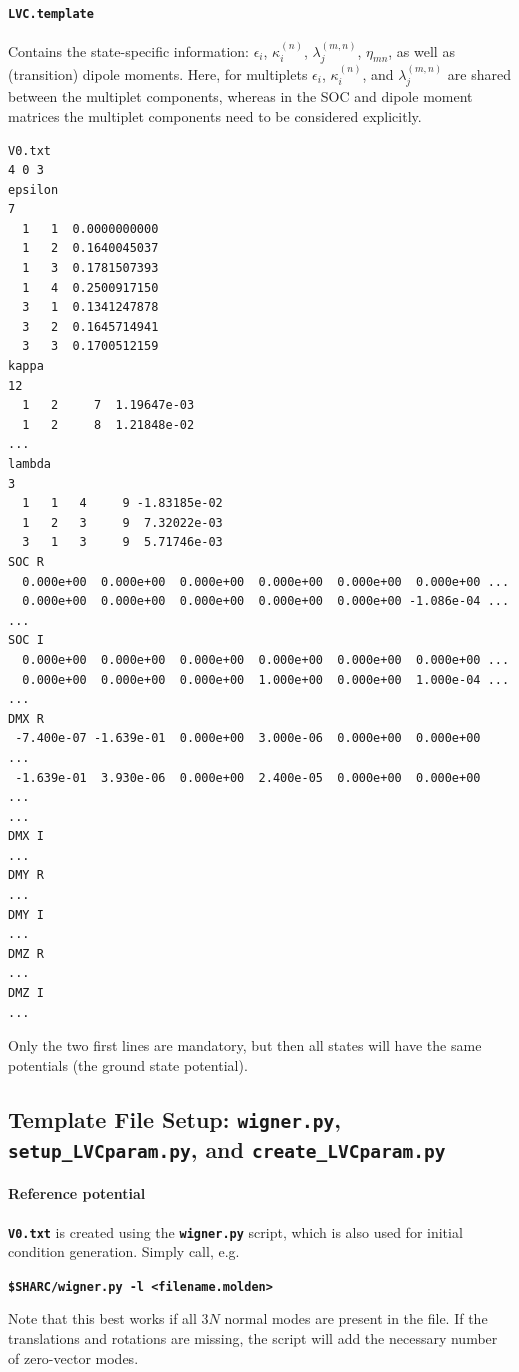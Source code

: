 \documentclass[a4paper,10pt,DIV=15,openany]{scrbook}
\newcommand{\ttt}[1]{\textbf{\texttt{#1}}}
\newenvironment{example}{
  \setlength{\OuterFrameSep}{3pt}
  \vspace{0mm}
  \definecolor{shadecolor}{HTML}{E4F4FF}
  \begin{shaded}
}{
  \end{shaded}
}
\begin{document}
\paragraph{\ttt{LVC.template}} Contains the state-specific information: $\epsilon_i$, $\kappa_i^{(n)}$, $\lambda_j^{(m,n)}$, $\eta_{mn}$, as well as (transition) dipole moments.
Here, for multiplets $\epsilon_i$, $\kappa_i^{(n)}$, and $\lambda_j^{(m,n)}$ are shared between the multiplet components, whereas in the SOC and dipole moment matrices the multiplet components need to be considered explicitly.
\begin{example}
\begin{verbatim}
V0.txt
4 0 3 
epsilon
7
  1   1  0.0000000000
  1   2  0.1640045037
  1   3  0.1781507393
  1   4  0.2500917150
  3   1  0.1341247878
  3   2  0.1645714941
  3   3  0.1700512159
kappa
12
  1   2     7  1.19647e-03
  1   2     8  1.21848e-02
...
lambda
3
  1   1   4     9 -1.83185e-02
  1   2   3     9  7.32022e-03
  3   1   3     9  5.71746e-03
SOC R
  0.000e+00  0.000e+00  0.000e+00  0.000e+00  0.000e+00  0.000e+00 ...
  0.000e+00  0.000e+00  0.000e+00  0.000e+00  0.000e+00 -1.086e-04 ...
...
SOC I
  0.000e+00  0.000e+00  0.000e+00  0.000e+00  0.000e+00  0.000e+00 ...
  0.000e+00  0.000e+00  0.000e+00  1.000e+00  0.000e+00  1.000e-04 ...
...
DMX R
 -7.400e-07 -1.639e-01  0.000e+00  3.000e-06  0.000e+00  0.000e+00  ...
 -1.639e-01  3.930e-06  0.000e+00  2.400e-05  0.000e+00  0.000e+00  ...
...
DMX I
...
DMY R
...
DMY I
...
DMZ R
...
DMZ I
...
\end{verbatim}
\end{example}
Only the two first lines are mandatory, but then all states will have the same potentials (the ground state potential).


\subsection{Template File Setup: \ttt{wigner.py}, \ttt{setup\_LVCparam.py}, and \ttt{create\_LVCparam.py}}\label{sec:setup_LVCparam.py}

\paragraph{Reference potential}

\ttt{V0.txt} is created using the \ttt{wigner.py} script, which is also used for initial condition generation. Simply call, e.g.
\begin{example}
\ttt{\$SHARC/wigner.py -l <filename.molden>}
\end{example}
Note that this best works if all $3N$ normal modes are present in the file. If the translations and rotations are missing, the script will add the necessary number of zero-vector modes.
\end{document}
